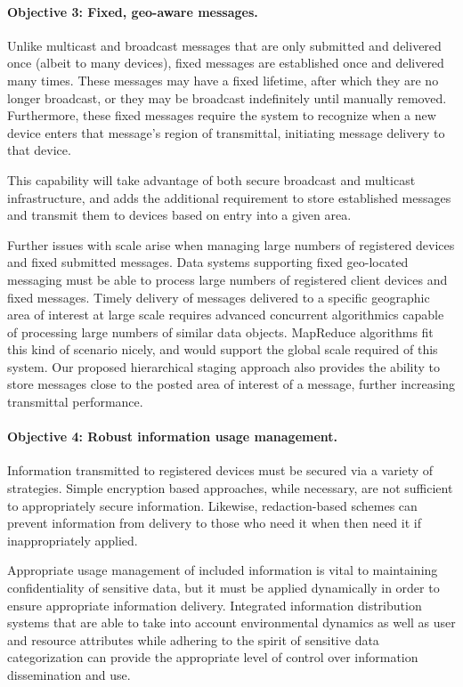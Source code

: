 \documentclass{sbir}
\begin{document}
\paragraph{Objective 3: Fixed, geo-aware messages.} Unlike multicast and broadcast messages that are only submitted and delivered once (albeit to many devices), fixed messages are established once and delivered many times. These messages may have a fixed lifetime, after which they are no longer broadcast, or they may be broadcast indefinitely until manually removed. Furthermore, these fixed messages require the system to recognize when a new device enters that message's region of transmittal, initiating message delivery to that device.

This capability will take advantage of both secure broadcast and multicast infrastructure, and adds the additional requirement to store established messages and transmit them to devices based on entry into a given area.

Further issues with scale arise when managing large numbers of registered devices and fixed submitted messages. Data systems supporting fixed geo-located messaging must be able to process large numbers of registered client devices and fixed messages. Timely delivery of messages delivered to a specific geographic area of interest at large scale requires advanced concurrent algorithmics capable of processing large numbers of similar data objects. MapReduce algorithms fit this kind of scenario nicely, and would support the global scale required of this system. Our proposed hierarchical staging approach also provides the ability to store messages close to the posted area of interest of a message, further increasing transmittal performance.

\paragraph{Objective 4: Robust information usage management.} Information transmitted to registered devices must be secured via a variety of strategies. Simple encryption based approaches, while necessary, are not sufficient to appropriately secure information. Likewise, redaction-based schemes can prevent information from delivery to those who need it when then need it if inappropriately applied.

Appropriate usage management of included information is vital to maintaining confidentiality of sensitive data, but it must be applied dynamically in order to ensure appropriate information delivery. Integrated information distribution systems that are able to take into account environmental dynamics as well as user and resource attributes while adhering to the spirit of sensitive data categorization can provide the appropriate level of control over information dissemination and use.
\end{document}
